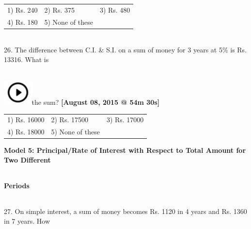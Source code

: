 \documentclass{article}
\begin{document}
	\noindent \begin{tabular}{p{1.7in} p{1.6in} p{1.6in}} \\ 
 1) Rs. 240                   &  2) Rs. 375            &  3) Rs. 480            \\
4) Rs. 180            & 5) None of these  \\
\end{tabular}
	
	\noindent 
	
	\noindent 
	
	\noindent  \\ 

	26. The difference between C.I. \& S.I. on a sum of money for 3 years at 5\% is Rs. 13316. What is
	
	\noindent  
\noindent \\ \includegraphics*[width=0.60in, height=0.52in]{images/image1}the sum?   \textbf{[August 08, 2015 @ 54m 30s]}
	
	\noindent \begin{tabular}{p{1.7in} p{1.6in} p{1.6in}} \\ 
 1) Rs. 16000               &  2) Rs. 17500        &  3) Rs. 17000        \\
4) Rs. 18000        & 5) None of these  \\
\end{tabular}
	
	\noindent 
	
	\noindent 
	
	\noindent 
	
	\noindent 
	
	\noindent 
	
	\noindent 
	
	\noindent 
	
	\noindent 
	\newpage
	\noindent   \textbf{Model 5: Principal/Rate of Interest with Respect to Total Amount for Two Different}
	
	\noindent 
	
	\noindent  \\ \textbf{Periods}
	
	\noindent 
	
	\noindent 
	
	\noindent  \\ 27. On simple interest, a sum of money becomes Rs. 1120 in 4 years and Rs. 1360 in 7 years. How
	
\end{document}
